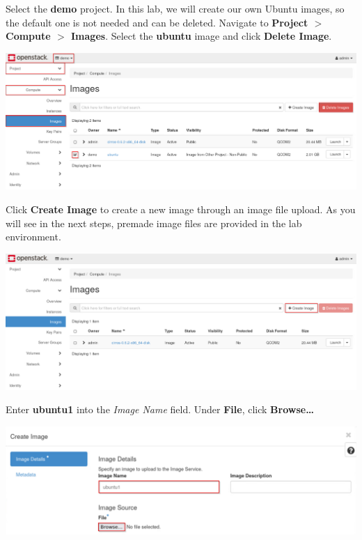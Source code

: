 \documentclass[letterpaper, 12pt]{article}
\begin{document}
\begin{enumerate}
    \begin{labstep}
        Select the \textbf{demo} project.
        In this lab, we will create our own Ubuntu images, so the default one is not needed and can be deleted.
        Navigate to \textbf{Project $>$ Compute $>$ Images}.
        Select the \textbf{ubuntu} image and click \textbf{Delete Image}.

        \begin{center}
            \includegraphics[width=\linewidth]{images/part1/step4.png}
        \end{center}
    \end{labstep}

    \begin{labstep}
        Click \textbf{Create Image} to create a new image through an image file upload.
        As you will see in the next steps, premade image files are provided in the lab environment.

        \begin{center}
            \includegraphics[width=\linewidth]{images/part1/step5.png}
        \end{center}
    \end{labstep}

    \begin{labstep}
        Enter \textbf{ubuntu1} into the \textit{Image Name} field.
        Under \textbf{File}, click \textbf{Browse…}

        \begin{center}
            \includegraphics[width=\linewidth]{images/part1/step6.png}
        \end{center}
    \end{labstep}


\end{enumerate}
\end{document}
